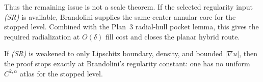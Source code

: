 \documentclass[11pt]{article}
\begin{document}
Thus the remaining issue is not a scale theorem.  If the selected regularity
input \emph{(SR)} is available, Brandolini supplies the same-center annular
core for the stopped level.  Combined with the Plan~3 radial-hull pocket
lemma, this gives the required radialization at \(O(\delta)\) fill cost and
closes the planar hybrid route.

If \emph{(SR)} is weakened to only Lipschitz boundary, density, and bounded
\(|\nabla u|\), then the proof stops exactly at Brandolini's regularity
constant: one has no uniform \(C^{2,\alpha}\) atlas for the stopped level.
\end{document}
